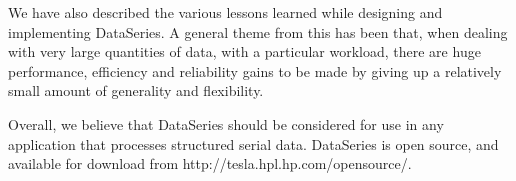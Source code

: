 \documentclass{acm_proc_article-sp}
\begin{document}
We have also described the various lessons learned while designing and
implementing DataSeries. A general theme from this has been that, when
dealing with very large quantities of data, with a particular workload,
there are huge performance, efficiency and reliability gains to be made
by giving up a relatively small amount of generality and flexibility. 

Overall, we believe that DataSeries should be considered for use in
any application that processes structured serial data. DataSeries is
open source, and available for download from
http://tesla.hpl.hp.com/opensource/.


{\small

}
%
%
\balancecolumns
\end{document}
